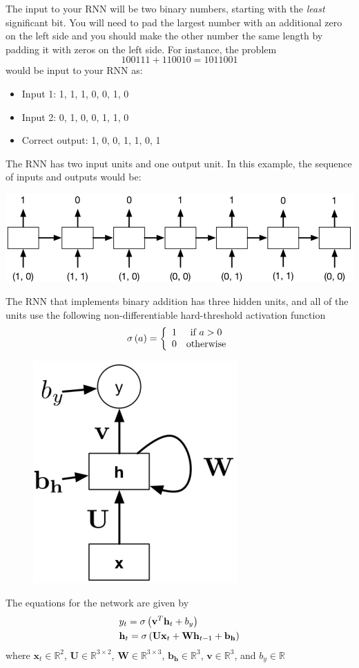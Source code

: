\documentclass[11pt, oneside]{article}   	%
\begin{document}
The input to your RNN will be two binary numbers, starting with the \emph{least} significant bit. You will need to pad the largest number with an additional zero on the left side and you should make the other number the same length by padding it with zeros on the left side. For instance, the problem
\[
100111 + 110010 = 1011001
\]
would be input to your RNN as:
\begin{itemize}
\item Input 1: 1, 1, 1, 0, 0, 1, 0
\item Input 2: 0, 1, 0, 0, 1, 1, 0
\item Correct output: 1, 0, 0, 1, 1, 0, 1
\end{itemize}

The RNN has two input units and one output unit. In this example, the sequence of inputs and outputs would be:

\includegraphics[width=\linewidth]{example.png}

The RNN that implements binary addition has three hidden units, and all of the units use the following non-differentiable hard-threshold activation function
\[
\sigma \left( a \right) = \left\{ {\begin{array}{*{20}c}
   1 & {{\text{if }}a > 0}  \\
   0 & {{\text{otherwise}}}  \\

 \end{array} } \right.
\]

\begin{figure}
\centering
\includegraphics[width = .3\linewidth]{rnn.png}
\end{figure}

The equations for the network are given by
\[
\begin{gathered}
  y_t  = \sigma \left( {{\mathbf{v}}^T {\mathbf{h}}_t  + b_y } \right) \hfill \\
  {\mathbf{h}}_t  = \sigma \left( {{\mathbf{Ux}}_t  + {\mathbf{Wh}}_{t - 1}  + {\mathbf{b}}_{\mathbf{h}} } \right) \hfill \\ 
\end{gathered} 
\]
where $\mathbf{x}_t \in \mathbb{R}^2$, $\mathbf{U} \in \mathbb{R}^{3 \times 2} $, $\mathbf{W} \in \mathbb{R}^{3 \times 3} $,  $\mathbf{b}_\mathbf{h} \in \mathbb{R}^{3}$,  $\mathbf{v} \in \mathbb{R}^3$, and $b_y \in \mathbb{R}$
\end{document}
